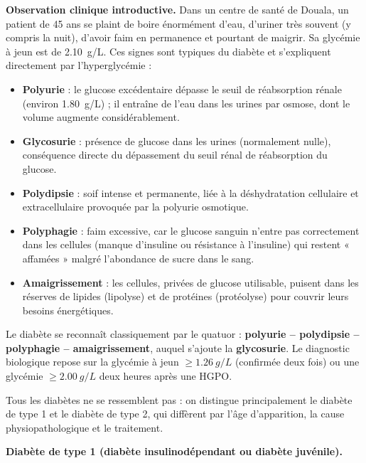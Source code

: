 \documentclass[11pt]{article}
\newcounter{popsec}
\newcounter{popsub}
\newcommand{\courssub}[1]{%
  \stepcounter{popsub}%
  \par\vspace{9pt}\noindent{\popxbold\fontsize{11.5}{13}\selectfont\color{popink}{\color{poporange}\thepopsec.\thepopsub}\hspace{6pt}#1}\par\nopagebreak\vspace{4pt}
}
\begin{document}
\textbf{Observation clinique introductive.} Dans un centre de santé de Douala, un patient de 45 ans se plaint de boire énormément d'eau, d'uriner très souvent (y compris la nuit), d'avoir faim en permanence et pourtant de maigrir. Sa glycémie à jeun est de \SI{2,10}{g/L}. Ces signes sont typiques du diabète et s'expliquent directement par l'hyperglycémie :

\begin{itemize}
\item \textbf{Polyurie} : le glucose excédentaire dépasse le seuil de réabsorption rénale (environ \SI{1,80}{g/L}) ; il entraîne de l'eau dans les urines par osmose, dont le volume augmente considérablement.
\item \textbf{Glycosurie} : présence de glucose dans les urines (normalement nulle), conséquence directe du dépassement du seuil rénal de réabsorption du glucose.
\item \textbf{Polydipsie} : soif intense et permanente, liée à la déshydratation cellulaire et extracellulaire provoquée par la polyurie osmotique.
\item \textbf{Polyphagie} : faim excessive, car le glucose sanguin n'entre pas correctement dans les cellules (manque d'insuline ou résistance à l'insuline) qui restent « affamées » malgré l'abondance de sucre dans le sang.
\item \textbf{Amaigrissement} : les cellules, privées de glucose utilisable, puisent dans les réserves de lipides (lipolyse) et de protéines (protéolyse) pour couvrir leurs besoins énergétiques.
\end{itemize}

\begin{aretenir}
Le diabète se reconnaît classiquement par le quatuor : \textbf{polyurie -- polydipsie -- polyphagie -- amaigrissement}, auquel s'ajoute la \textbf{glycosurie}. Le diagnostic biologique repose sur la glycémie à jeun $\geq \SI{1,26}{g/L}$ (confirmée deux fois) ou une glycémie $\geq \SI{2,00}{g/L}$ deux heures après une HGPO.
\end{aretenir}

\courssub{Les deux grands types de diabète}

Tous les diabètes ne se ressemblent pas : on distingue principalement le diabète de type 1 et le diabète de type 2, qui diffèrent par l'âge d'apparition, la cause physiopathologique et le traitement.

\textbf{Diabète de type 1 (diabète insulinodépendant ou diabète juvénile).}
\end{document}
